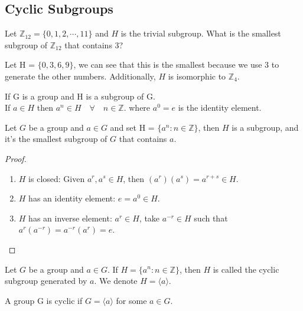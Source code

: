 \subsection{Cyclic Subgroups}

\begin{exercise}
    Let $\mathbb{Z}_{12} = \{0, 1, 2, \cdots, 11\}$ and $H$ is the trivial subgroup. What is the smallest subgroup of $\mathbb{Z}_{12}$ that contains $3$?
\end{exercise}
\begin{answer}
    Let H = $\{0, 3, 6, 9\}$, we can see that this is the smallest because we use 3 to generate the other numbers.
    Additionally, $H$ is isomorphic to $\mathbb{Z}_4$.
\end{answer}

\begin{remark}
    If G is a group and H is a subgroup of G.\\
    If $a \in H$ then $a^n \in H \quad \forall \quad n \in \mathbb{Z}$.
    where $a^0 = e$ is the identity element.
\end{remark}

\begin{theorem}
    Let $G$ be a group and $a \in G$ and set H = $\{a^n : n \in \mathbb{Z}\}$, then $H$ is a subgroup, and it's the smallest subgroup 
    of $G$ that contains $a$.
\end{theorem}
\begin{proof}
    \vphantom{}\\
    \begin{enumerate}
        \item $H$ is closed:
        Given $a^r, a^s \in H$, then $(a^r)(a^s) = a^{r+s} \in H$.
        \item $H$ has an identity element: $e = a^0 \in H$.
        \item $H$ has an inverse element: $a^r \in H$, take $a^{-r} \in H$ such that $a^r(a^{-r}) = a^{-r}(a^r) = e$.
    \end{enumerate}
\end{proof}

\begin{definition}
    Let $G$ be a group and $a \in G$. If $H = \{a^n : n \in \mathbb{Z}\}$, then $H$ is called the cyclic subgroup generated by $a$.
    We denote $H = \langle a \rangle$.
\end{definition}

\begin{definition}
    A group G is cyclic if $G = \langle a \rangle$ for some $a \in G$.
\end{definition}

